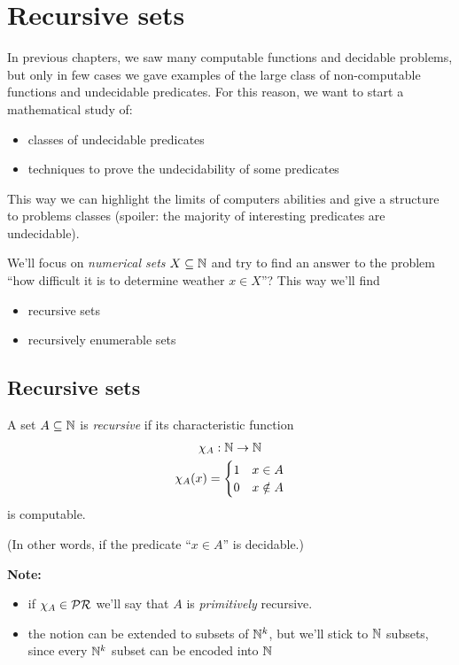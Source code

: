 \chapter{Recursive sets}
In previous chapters, we saw many computable functions and decidable problems, but
only in few cases we gave examples of the large class of
non-computable functions and undecidable predicates. For this reason,
we want to start a mathematical study of:
\begin{itemize}
  \item classes of undecidable predicates
  \item techniques to prove the undecidability of some predicates
\end{itemize}
This way we can highlight the limits of computers abilities and give a
structure to problems classes (spoiler: the majority of interesting
predicates are undecidable).

We'll focus on \emph{numerical sets} $X \subseteq \mathbb{N}$ and try to find
an answer to the problem ``how difficult it is to determine weather
$x \in X$''? This way we'll find
\begin{itemize}
\item recursive sets
\item recursively enumerable sets
\end{itemize}

\section{Recursive sets}
\begin{definition}
  A set $A \subseteq \mathbb{N}$ is \emph{recursive} if its characteristic
  function
  \begin{gather*}
    \chi_A : \mathbb{N} \to \mathbb{N} \\
    \chi_A(x) = \begin{cases}
      1 & x\in A \\
      0 & x \notin A
    \end{cases}
  \end{gather*}
  is computable.
\end{definition}

(In other words, if the predicate ``$x \in A$'' is decidable.)

\textbf{Note:}
\begin{itemize}
\item if $\chi_A \in \mathcal{PR}$ we'll say that $A$ is \emph{primitively}
  recursive.
\item the notion can be extended to subsets of $\mathbb{N}^k$, but we'll
  stick to $\mathbb{N}$ subsets, since every $\mathbb{N}^k$ subset can be encoded
  into $\mathbb{N}$
\end{itemize}


